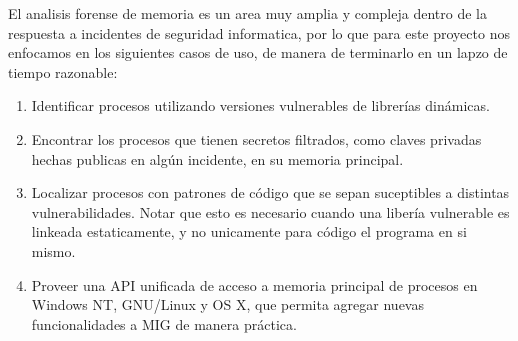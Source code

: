 El analisis forense de memoria es un area muy amplia y compleja dentro de la
respuesta a incidentes de seguridad informatica, por lo que para este proyecto
nos enfocamos en los siguientes casos de uso, de manera de terminarlo en un
lapzo de tiempo razonable:

\begin{enumerate}

\item Identificar procesos utilizando versiones vulnerables de librerías
    dinámicas.

\item Encontrar los procesos que tienen secretos filtrados, como claves
    privadas hechas publicas en algún incidente, en su memoria principal.

\item Localizar procesos con patrones de código que se sepan suceptibles a
    distintas vulnerabilidades. Notar que esto es necesario cuando una libería
    vulnerable es linkeada estaticamente, y no unicamente para código el
    programa en si mismo.

\item Proveer una API unificada de acceso a memoria principal de procesos en
    Windows NT, GNU/Linux y OS X, que permita agregar nuevas funcionalidades a
    MIG de manera práctica.

\end{enumerate}
